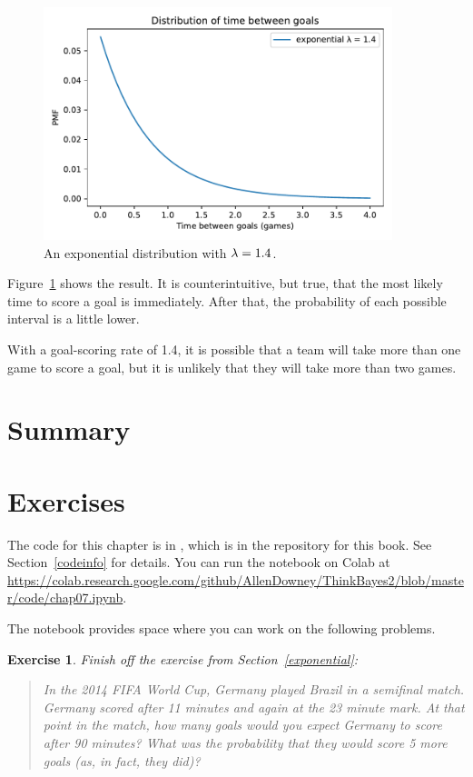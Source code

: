 \documentclass[12pt]{book}
\theoremstyle{exercise}
\newtheorem{exercise}{Exercise}[chapter]
\begin{document}
\begin{figure}
\centerline{\includegraphics[width=4in]{figs/fig07-05.pdf}}
\caption{An exponential distribution with $\mathtt{\lambda} = 1.4$.}
\label{fig07-05}
\end{figure}

Figure~\ref{fig07-05} shows the result.
It is counterintuitive, but true, that the most likely time to score a goal is immediately.  After that, the probability of each possible interval is a little lower.

With a goal-scoring rate of 1.4, it is possible that a team will take more than one game to score a goal, but it is unlikely that they will take more than two games.


\section{Summary}



\section{Exercises}

The code for this chapter is in , which is in the repository for this book.  See Section~\ref{codeinfo} for details.
You can run the notebook on Colab at \url{https://colab.research.google.com/github/AllenDowney/ThinkBayes2/blob/master/code/chap07.ipynb}.

The notebook provides space where you can work on the following problems.


\begin{exercise}
Finish off the exercise from Section~\ref{exponential}:

\begin{quote}
In the 2014 FIFA World Cup, Germany played Brazil in a semifinal match. Germany scored after 11 minutes and again at the 23 minute mark. 
At that point in the match, how many goals would you expect Germany to score after 90 minutes? 
What was the probability that they would score 5 more goals (as, in fact, they did)?
\end{quote}

\end{exercise}
\end{document}
